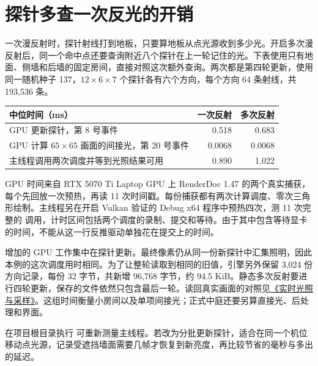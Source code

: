 \clearpage
{}
\section{探针多查一次反光的开销}
一次漫反射时，探针射线打到地板，只要算地板从点光源收到多少光。开启多次漫反射后，同一个命中点还要查询附近八个探针在上一轮记住的光。下表使用只有地面、侧墙和后墙的固定房间，直接对照这次额外查询。两次都是第四轮更新，使用同一随机种子 137，$12\times6\times7$ 个探针各有六个方向，每个方向 64 条射线，共 193,536 条。

\begin{center}\smalltable
\begin{tabular}{lrr}
\toprule
中位时间（ms）& 一次反射 & 多次反射\\
\midrule
GPU 更新探针，第 8 号事件 & 0.518 & 0.683\\
GPU 计算 $65\times65$ 画面的间接光，第 20 号事件 & 0.0068 & 0.0068\\
主线程调用两次调度并等到光照结果可用 & 0.890 & 1.022\\
\bottomrule
\end{tabular}
\end{center}

GPU 时间来自 RTX 5070 Ti Laptop GPU 上 RenderDoc 1.47 的两个真实捕获，每个先回放一次预热，再读 11 次时间戳。每份捕获都有两次计算调度、零次三角形绘制。主线程另在开启 Vulkan 验证的 Debug x64 程序中预热四次，测 11 次完整的  调用，计时区间包括两个调度的录制、提交和等待。由于其中包含等待显卡的时间，不能从这一行反推驱动单独花在提交上的时间。

增加的 GPU 工作集中在探针更新。最终像素仍从同一份新探针中汇集照明，因此本例的这次调度用时相同。为了让整轮读取到相同的旧值，引擎另外保留 3,024 份方向记录，每份 32 字节，共新增 96,768 字节，约 94.5 KiB。静态多次反射要进行四轮更新，保存的文件依然只包含最后一轮。读回真实画面的对照见\href{run:Redflag-Realtime-Lighting.pdf}{《实时光照与采样》}。这组时间衡量小房间以及单项间接光；正式中庭还要另算直接光、后处理和界面。

在项目根目录执行  可重新测量主线程。若改为分批更新探针，适合在同一个机位移动点光源，记录受遮挡墙面需要几帧才恢复到新亮度，再比较节省的毫秒与多出的延迟。
